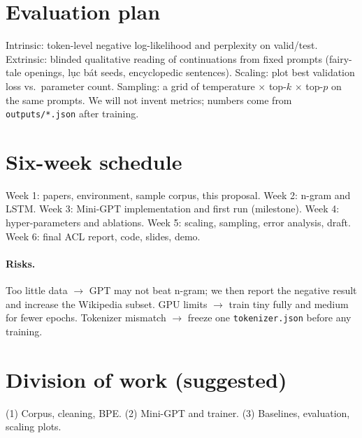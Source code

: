 \documentclass[11pt]{article}
\begin{document}
\section{Evaluation plan}

Intrinsic: token-level negative log-likelihood and perplexity on valid/test. Extrinsic: blinded qualitative reading of continuations from fixed prompts (fairy-tale openings, lục bát seeds, encyclopedic sentences). Scaling: plot best validation loss vs.\ parameter count. Sampling: a grid of temperature $\times$ top-$k$ $\times$ top-$p$ on the same prompts. We will not invent metrics; numbers come from \texttt{outputs/*.json} after training.

\section{Six-week schedule}

Week 1: papers, environment, sample corpus, this proposal. Week 2: n-gram and LSTM. Week 3: Mini-GPT implementation and first run (milestone). Week 4: hyper-parameters and ablations. Week 5: scaling, sampling, error analysis, draft. Week 6: final ACL report, code, slides, demo.

\paragraph{Risks.} Too little data $\rightarrow$ GPT may not beat n-gram; we then report the negative result and increase the Wikipedia subset. GPU limits $\rightarrow$ train tiny fully and medium for fewer epochs. Tokenizer mismatch $\rightarrow$ freeze one \texttt{tokenizer.json} before any training.

\section{Division of work (suggested)}

(1) Corpus, cleaning, BPE. (2) Mini-GPT and trainer. (3) Baselines, evaluation, scaling plots.


\end{document}
